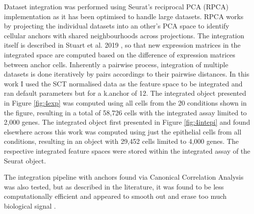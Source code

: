Dataset integration was performed using Seurat's reciprocal PCA (RPCA) implementation \cite{hao_integrated_2021} as it has been optimised to handle large datasets. RPCA works by projecting the individual datasets into an other's PCA space to identify cellular anchors with shared neighbourhoods across projections. The integration itself is described in Stuart et al. 2019 \cite{stuart_integrative_2019}, so that new expression matrices in the integrated space are computed based on the difference of expression matrices between anchor cells. Inherently a pairwise process, integration of multiple datasets is done iteratively by pairs accordings to their pairwise distances. In this work I used the SCT normalised data as the feature space to be integrated and ran default parameters but for a k.anchor of 12.
The integrated object presented in Figure \ref{fig:4exp} was computed using all cells from the 20 conditions shown in the figure, resulting in a total of 58,726 cells with the integrated assay limited to 2,000 genes. The integrated object first presented in Figure \ref{fig:4intepi} and found elsewhere across this work was computed using just the epithelial cells from all conditions, resulting in an object with 29,452 cells limited to 4,000 genes. The respective integrated feature spaces were stored within the integrated assay of the Seurat object.

The integration pipeline with anchors found via Canonical Correlation Analysis was also tested, but as described in the literature, it was found to be less computationally efficient and appeared to smooth out and erase too much biological signal \cite{stuart_integrative_2019}. 

